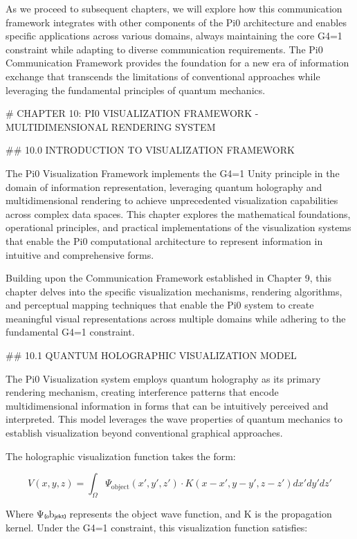 As we proceed to subsequent chapters, we will explore how this communication framework integrates with other components of the Pi0 architecture and enables specific applications across various domains, always maintaining the core G4=1 constraint while adapting to diverse communication requirements. The Pi0 Communication Framework provides the foundation for a new era of information exchange that transcends the limitations of conventional approaches while leveraging the fundamental principles of quantum mechanics.

# CHAPTER 10: PI0 VISUALIZATION FRAMEWORK - MULTIDIMENSIONAL RENDERING SYSTEM

## 10.0 INTRODUCTION TO VISUALIZATION FRAMEWORK

The Pi0 Visualization Framework implements the G4=1 Unity principle in the domain of information representation, leveraging quantum holography and multidimensional rendering to achieve unprecedented visualization capabilities across complex data spaces. This chapter explores the mathematical foundations, operational principles, and practical implementations of the visualization systems that enable the Pi0 computational architecture to represent information in intuitive and comprehensive forms.

Building upon the Communication Framework established in Chapter 9, this chapter delves into the specific visualization mechanisms, rendering algorithms, and perceptual mapping techniques that enable the Pi0 system to create meaningful visual representations across multiple domains while adhering to the fundamental G4=1 constraint.

## 10.1 QUANTUM HOLOGRAPHIC VISUALIZATION MODEL

The Pi0 Visualization system employs quantum holography as its primary rendering mechanism, creating interference patterns that encode multidimensional information in forms that can be intuitively perceived and interpreted. This model leverages the wave properties of quantum mechanics to establish visualization beyond conventional graphical approaches.

The holographic visualization function takes the form:

$$V(x, y, z) = \int_{\Omega} \Psi_{\text{object}}(x', y', z') \cdot K(x-x', y-y', z-z') dx' dy' dz'$$

Where Ψ₍ₒbⱼₑₖₜ₎ represents the object wave function, and K is the propagation kernel. Under the G4=1 constraint, this visualization function satisfies:

